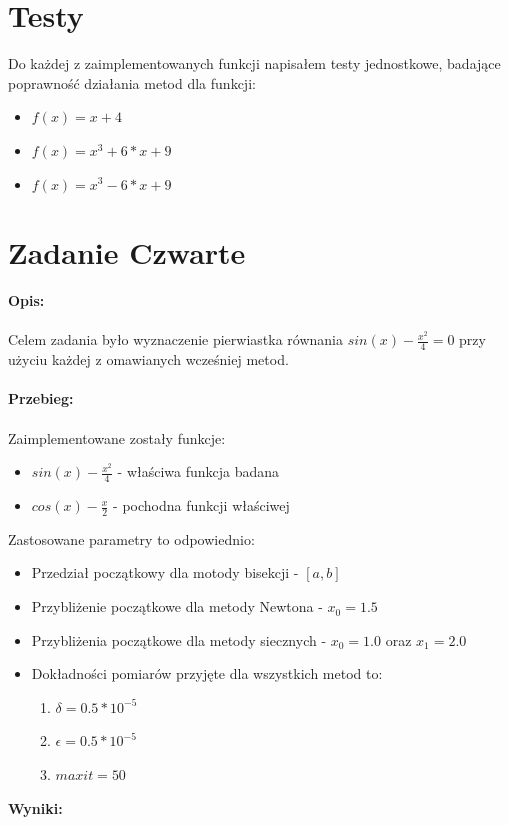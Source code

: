 \documentclass{article}
\begin{document}
\section*{Testy}
Do każdej z zaimplementowanych funkcji napisałem testy jednostkowe, badające poprawność działania metod dla funkcji:
\begin{itemize}
	\item $f(x) = x+4$
	\item $f(x) = x^3 +6*x+9$
	\item $f(x) = x^3 -6*x+9$
\end{itemize}
\section*{Zadanie Czwarte}
\noindent \textbf{Opis: }\\\\
Celem zadania było wyznaczenie pierwiastka równania $sin(x) - \frac{x^{2}}{4} = 0$ przy użyciu każdej z omawianych wcześniej metod.\\\\
\noindent \textbf{Przebieg: }\\\\
Zaimplementowane zostały funkcje:
\begin{itemize}
	\item $sin(x) - \frac{x^{2}}{4}$ - właściwa funkcja badana
	\item $cos(x) - \frac{x}{2}$ - pochodna funkcji właściwej
\end{itemize}
Zastosowane parametry to odpowiednio:
\begin{itemize}
	\item Przedział początkowy dla motody bisekcji - $[a,b]$
	\item Przybliżenie początkowe dla metody Newtona - $x_0 = 1.5$
	\item Przybliżenia początkowe dla metody siecznych - $x_0 = 1.0$ oraz $x_1 = 2.0$
	\item Dokładności pomiarów przyjęte dla wszystkich metod to:
	\begin{enumerate}
		\item $\delta = 0.5 * 10^{-5}$
		\item $\epsilon = 0.5 * 10^{-5}$
		\item $maxit = 50$
	\end{enumerate}
\end{itemize}
\noindent \textbf{Wyniki: }\\\\
\end{document}
